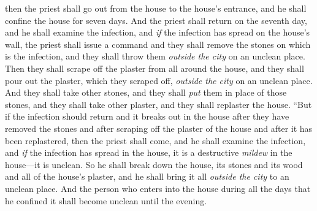 \begin{biblechapter}
\verse then the priest shall go out from the house to the house’s entrance, and he shall confine the house for seven days.
\verse And the priest shall return on the seventh day, and he shall examine the infection, and \textit{if} the infection has spread on the house’s wall,
\verse the priest shall issue a command and they shall remove the stones on which is the infection, and they shall throw them \textit{outside the city} on an unclean place.
\verse Then they shall scrape off the plaster from all around the house, and they shall pour out the plaster, which they scraped off, \textit{outside the city} on an unclean place.
\verse And they shall take other stones, and they shall \textit{put} them in place of those stones, and they shall take other plaster, and they shall replaster the house.
\verse “But if the infection should return and it breaks out in the house after they have removed the stones and after scraping off the plaster of the house and after it has been replastered,
\verse then the priest shall come, and he shall examine the infection, and \textit{if} the infection has spread in the house, it is a destructive \textit{mildew} in the house—it is unclean.
\verse So he shall break down the house, its stones and its wood and all of the house’s plaster, and he shall bring it all \textit{outside the city} to an unclean place.
\verse And the person who enters into the house during all the days that he confined it shall become unclean until the evening.

\end{biblechapter}
